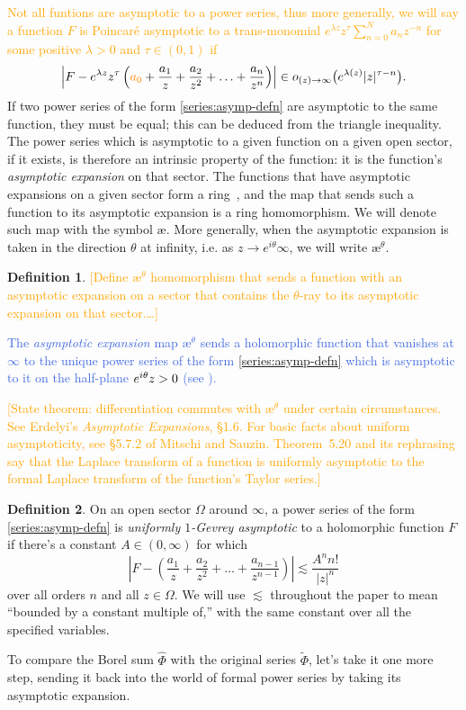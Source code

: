 \documentclass{article}
\let\Re\relax
\DeclareMathOperator{\Re}{Re}
\newcommand{\series}[1]{\tilde{#1}}
\newcommand{\aexp}{\text{\ae}}
\theoremstyle{definition}
\newtheorem{defn}{Definition}
\theoremstyle{plain}
\begin{document}
\textcolor{orange}{Not all funtions are asymptotic to a power series, thus more generally, we will say a function $F$ is Poincar\'e asymptotic to a trans-monomial $e^{\lambda z}z^\tau\sum_{n=0}^Na_nz^{-n}$ for some positive $\lambda>0$ and $\tau\in(0,1)$ if 
\[\left|F - e^{\lambda z}z^{\tau}\left(\textcolor{orange}{a_0}+\frac{a_1}{z} + \frac{a_2}{z^2} + \ldots + \frac{a_n}{z^n} \right) \right| \in o_{\Re(z) \to \infty}\big(e^{\lambda\Re(z)}|z|^{\tau-n}\big).\]}
If two power series of the form \eqref{series:asymp-defn} are asymptotic to the same function, they must be equal; this can be deduced from the triangle inequality. The power series which is asymptotic to a given function on a given open sector, if it exists, is therefore an intrinsic property of the function: it is the function's {\em asymptotic expansion} on that sector. The functions that have asymptotic expansions on a given sector form a ring~\cite[Section~A.4]{nikolaev2023existence}, and the map that sends such a function to its asymptotic expansion is a ring homomorphism. We will denote such map with the symbol $\aexp$. More generally, when the asymptotic expansion is taken in the direction $\theta$ at infinity, i.e. as $z\to e^{i\theta}\infty$, we will write $\aexp^\theta$.  

\begin{defn}
\textcolor{orange}{[Define $\aexp^\theta$ homomorphism that sends a function with an asymptotic expansion on a sector that contains the $\theta$-ray to its asymptotic expansion on that sector.\ldots]}
\end{defn}
\textcolor{RoyalBlue}{The {\em asymptotic expansion} map $\aexp^\theta$ sends a holomorphic function that vanishes at $\infty$ to the unique power series of the form \eqref{series:asymp-defn} which is asymptotic to it on the half-plane $\Re e^{i\theta}z > 0$ (see \cite[Theorem~C.11]{nikolaev2023existence}).}

\textcolor{orange}{[State theorem: differentiation commutes with $\aexp^\theta$ under certain circumstances. See Erdelyi's {\em Asymptotic Expansions}, \S 1.6. For basic facts about uniform asymptoticity, see \S 5.7.2 of Mitschi and Sauzin. Theorem~5.20 and its rephrasing say that the Laplace transform of a function is uniformly asymptotic to the formal Laplace transform of the function's Taylor series.]}

\begin{defn}\label{def:unif-gevrey-asymp}
On an open sector $\Omega$ around $\infty$, a power series of the form \eqref{series:asymp-defn} is {\em uniformly $1$-Gevrey asymptotic} to a holomorphic function $F$ if there's a constant $A \in (0, \infty)$ for which
\[ \left|F - \left(\frac{a_1}{z} + \frac{a_2}{z^2} + \ldots + \frac{a_{n-1}}{z^{n-1}} \right) \right| \lesssim \frac{A^n n!}{|z|^n} \]
over all orders $n$ and all $z \in \Omega$. We will use $\lesssim$ throughout the paper to mean ``bounded by a constant multiple of,'' with the same constant over all the specified variables.
\end{defn}
To compare the Borel sum $\hat{\Phi}$ with the original series $\series{\Phi}$, let's take it one more step, sending it back into the world of formal power series by taking its asymptotic expansion.
\end{document}
